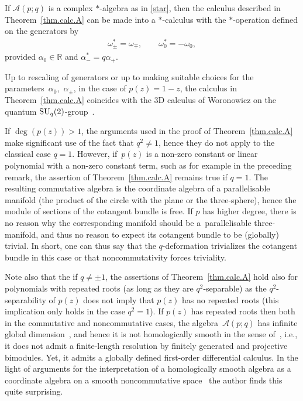 \documentclass[pdftex]{sigma}
\numberwithin{equation}{section}
\def\AWeyl#1#2{{\mathcal{A}}(#1;#2)}
\begin{document}
\begin{Remark}\label{rem.star}
If $\AWeyl p q$ is a complex $*$-algebra as in \eqref{star}, then the calculus described in Theorem~\ref{thm.calc.A} can be made into a $*$-calculus with the $*$-operation def\/ined on the generators by
\begin{gather*}
\omega^*_{\pm} = \omega_\mp, \qquad \omega_0^* = - \omega_0,
\end{gather*}
provided $\alpha_0 \in {\mathbb R}$ and $\alpha_-^* = q\alpha_+$.
\end{Remark}
\begin{Remark}\label{3d.wor}
Up to rescaling of generators or up to making suitable choices for the parame\-ters~$\alpha_0$,~$\alpha_\pm$, in the case of $p(z)=1-z$, the calculus in Theorem~\ref{thm.calc.A} coincides with the 3D calculus of Woronowicz on the quantum ${\rm SU}_q(2)$-group~\cite{Wor:twi}.
\end{Remark}

\begin{Remark}\label{rem.classical}
If $\deg(p(z))>1$, the arguments used in the proof of Theorem~\ref{thm.calc.A} make signif\/icant use of the fact that $q^2\neq 1$, hence they do not apply to the classical case $q=1$. However, if~$p(z)$ is a non-zero constant or linear polynomial with a non-zero constant term, such as for example in the preceding remark, the assertion of Theorem~\ref{thm.calc.A} remains true if $q=1$. The resulting commutative algebra is the coordinate algebra of a parallelisable manifold (the product of the circle with the plane or the three-sphere), hence the module of sections of the cotangent bundle is free. If $p$ has higher degree, there is no reason why the corresponding manifold should be a~parallelisable three-manifold, and thus no reason to expect its cotangent bundle to be (globally) trivial. In short, one can thus say that the $q$-deformation trivializes the cotangent bundle in this case or that noncommutativity forces triviality.

Note also that the if $q\neq \pm 1$, the assertions of Theorem~\ref{thm.calc.A} hold also for polynomials with repeated roots (as long as they are $q^2$-separable) as the $q^2$-separability of $p(z)$ does not imply that $p(z)$ has no repeated roots (this implication only holds in the case $q^2=1$). If $p(z)$ has repeated roots then both in the commutative and noncommutative cases, the algebra~$\AWeyl p q $ has inf\/inite global dimension~\cite{Bav:gweyl}, and hence it is not homologically smooth in the sense of~\cite{Van:rel}, i.e., it does not admit a f\/inite-length resolution by f\/initely generated and projective bimodules. Yet, it admits a globally def\/ined f\/irst-order dif\/ferential calculus. In the light of arguments for the interpretation of a homologically smooth algebra as a coordinate algebra on a smooth noncommutative space~\cite{Kra:Hoc} the author f\/inds this quite surprising.
\end{Remark}
\end{document}
